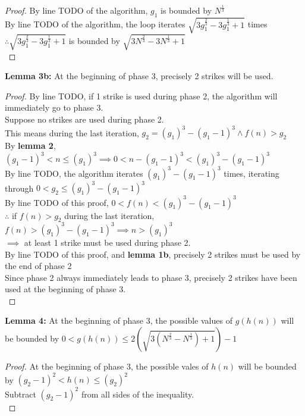 \begin{problem}
\begin{proof}
    By line TODO of the algorithm, $g_1$ is bounded by $N^{\frac{1}{3}}$ \\
    By line TODO of the algorithm, the loop iterates $\sqrt{3g_1^{\frac{2}{3}} - 3g_1^{\frac{1}{3}} + 1}$ times \\
    $\therefore \sqrt{3g_1^{\frac{2}{3}} - 3g_1^{\frac{1}{3}} + 1}$ is bounded by $\sqrt{3N^{\frac{2}{3}} - 3N^{\frac{1}{3}} + 1}$ \\
  \end{proof}
  \textbf{Lemma 3b:} At the beginning of phase 3, precisely 2 strikes will be used. \\
  \begin{proof}
    By line TODO, if 1 strike is used during phase 2, the algorithm will immediately go to phase 3. \\
    Suppose no strikes are used during phase 2. \\
    This means during the last iteration, $g_2 = (g_1)^3 - (g_1 - 1)^3 \land f(n) > g_2$ \\
    By \textbf{lemma 2}, $(g_1 - 1)^3 < n \leq (g_1)^3 \implies 0 < n - (g_1 - 1)^3 < (g_1)^3 - (g_1 - 1)^3$ \\
    By line TODO, the algorithm iterates $(g_1)^3 - (g_1 - 1)^3$ times, iterating through $0 < g_2 \leq (g_1)^3 - (g_1 - 1)^3$ \\
    By line TODO of this proof, $0 < f(n) < (g_1)^3 - (g_1 - 1)^3$ \\
    $\therefore $ if $f(n) > g_2$ during the last iteration, $f(n) > (g_1)^3 - (g_1 - 1)^3 \implies n > (g_1)^3$ \\
    $\implies $ at least 1 strike must be used during phase 2. \\
    By line TODO of this proof, and \textbf{lemma 1b}, precisely 2 strikes must be used by the end of phase 2 \\
    Since phase 2 always immediately leads to phase 3, precisely 2 strikes have been used at the beginning of phase 3. \\
  \end{proof}
  \textbf{Lemma 4:} At the beginning of phase 3, the possible values of $g(h(n))$ will be bounded by $0 < g(h(n)) \leq 2(\sqrt{3(N^{\frac{2}{3}} - N^{\frac{1}{3}}) + 1}) - 1$ \\
  \begin{proof}
    At the beginning of phase 3, the possible vales of $h(n)$ will be bounded by $(g_2 - 1)^2 < h(n) \leq (g_2)^2$ \\
    Subtract $(g_2 - 1)^2$ from all sides of the inequality. \\

\end{proof}
\end{problem}
